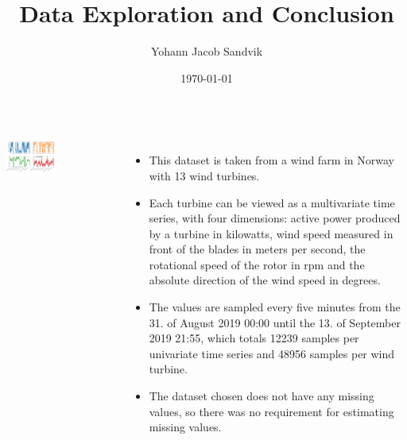\documentclass[18pt, a3paper, portrait]{tikzposter}
\title{Data Exploration and Conclusion}
\author{Yohann Jacob Sandvik}
\date{\today}
\institute{Institute of Electronic Systems - NTNU}
\begin{document}
 
\maketitle 

\begin{columns}
    {
        \begin{tikzfigure}
            \includegraphics[width=0.45\textwidth]{images/one_turbine_all_vals.png}
        \end{tikzfigure}
    }
 
    {
        \begin{itemize}
            \item This dataset is taken from a wind farm in Norway with 13 wind turbines.
            \item Each turbine can be viewed as a multivariate time series, with four dimensions: active power produced by a turbine in kilowatts, wind speed measured in front of the blades in meters per second, the rotational speed of the rotor in rpm and the absolute direction of the wind speed in degrees.
            \item The values are sampled every five minutes from the 31. of August 2019 00:00 until the 13. of September 2019 21:55, which totals 12239 samples per univariate time series and 48956 samples per wind turbine.
            \item The dataset chosen does not have any missing values, so there was no requirement for estimating missing values.
        \end{itemize}
        \vspace{9.5cm}
    }
\end{columns}
\end{document}
